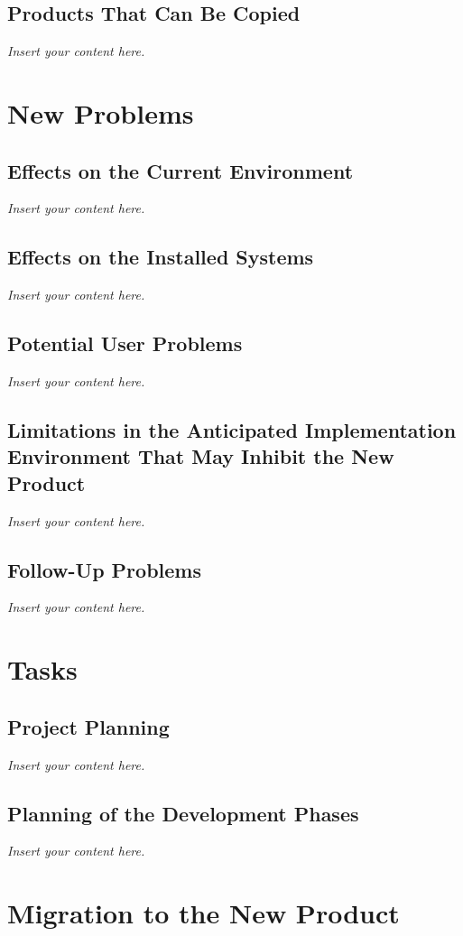 \documentclass[12pt]{article}
\newcommand{\lips}{\textit{Insert your content here.}}
\begin{document}
\subsection{Products That Can Be Copied}
\lips

\section{New Problems}
\subsection{Effects on the Current Environment}
\lips
\subsection{Effects on the Installed Systems}
\lips
\subsection{Potential User Problems}
\lips
\subsection{Limitations in the Anticipated Implementation Environment That May
Inhibit the New Product}
\lips
\subsection{Follow-Up Problems}
\lips

\section{Tasks}
\subsection{Project Planning}
\lips
\subsection{Planning of the Development Phases}
\lips

\section{Migration to the New Product}
\end{document}
